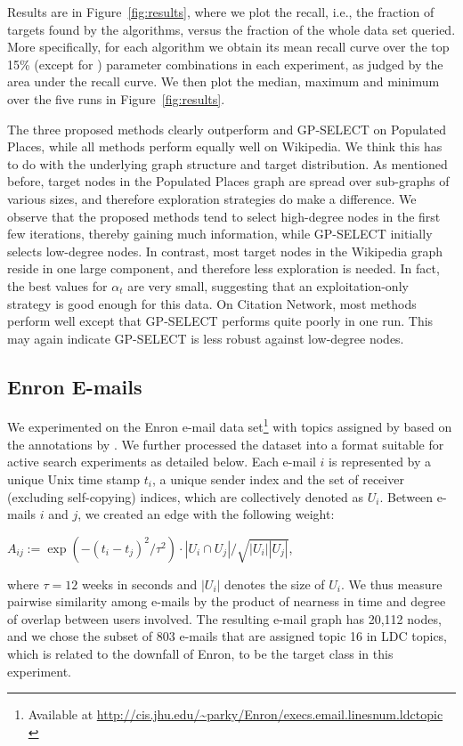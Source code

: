 Results are in  Figure~\ref{fig:results}, where we plot the recall, i.e., the fraction of 
targets found by the algorithms, versus the fraction of the whole data set queried.
More specifically, for each algorithm we obtain its mean recall curve over the top 15\% (except for \cite{wang2013active})
parameter combinations in each experiment, as judged by the area under the recall curve.
We then plot the median, maximum and minimum over the five runs in Figure~\ref{fig:results}.

The three proposed methods clearly outperform \cite{wang2013active} and GP-SELECT on Populated Places, while all methods 
perform equally well on Wikipedia. We think this has to do with the underlying graph structure and target distribution.
As mentioned before, target nodes in the Populated Places graph are spread over sub-graphs of various sizes, and therefore exploration strategies 
do make a difference. We observe that the proposed methods tend to select high-degree nodes in the first few iterations, thereby
gaining much information, while GP-SELECT initially selects low-degree nodes.  
In contrast, most target nodes in the Wikipedia graph reside in one large component, and therefore 
less exploration is needed. In fact, the best values for $\alpha_t$ are very small, suggesting that an exploitation-only 
strategy is good enough for this data. On Citation Network, most methods perform well except that GP-SELECT performs 
quite poorly in one run. This may again indicate GP-SELECT is less robust against low-degree nodes. 
\subsection{Enron E-mails}
We experimented on the Enron e-mail data set\footnote{Available at \url{http://cis.jhu.edu/~parky/Enron/execs.email.linesnum.ldctopic} \label{note:enron}} 
with topics assigned by \cite{enron} based on the annotations by \cite{enron_topics}. 
We further processed the dataset into a format suitable for active search experiments as detailed below. 
Each e-mail $i$ is represented by a unique Unix time stamp $t_i$, a unique sender index and the set of receiver (excluding self-copying) indices, which are collectively 
denoted as $U_i$. Between e-mails $i$ and $j$, we created an edge with the following weight:

\centerline{
$A_{ij} :=  \exp\left( - (t_i - t_j)^2 / \tau^2 \right) \cdot |U_i \cap U_j| / \sqrt{|U_i||U_j|}$,	
}

where $\tau = 12$ weeks in seconds and $|U_i|$ denotes the size of $U_i$. 
We thus measure pairwise similarity among e-mails by the product of 
nearness in time and degree of overlap between users involved. 
The resulting e-mail graph has 20,112 nodes, and we chose the subset of 803 e-mails that are assigned topic 16 in LDC topics, 
which is related to the downfall of Enron, to be the target class in this experiment.

